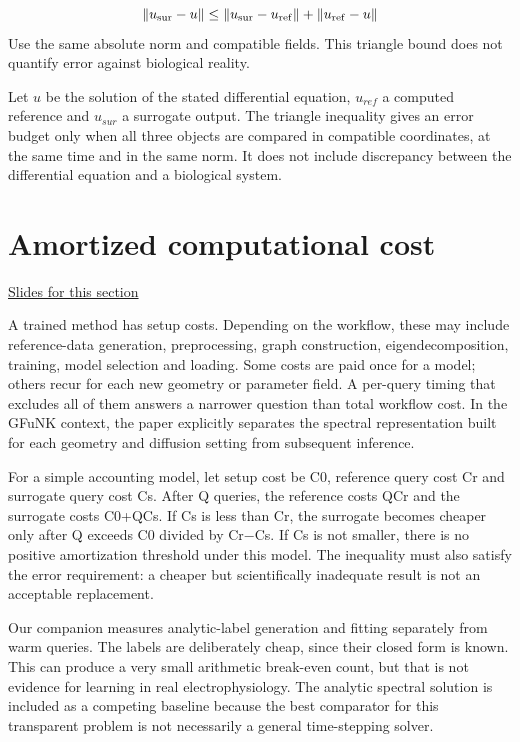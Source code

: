 \documentclass[11pt,letterpaper]{article}
\theoremstyle{definition}\newtheorem{definition}{Definition}\newtheorem{example}{Example}
\numberwithin{equation}{section}
\begin{document}
\[
\|u_{\rm sur}-u\|\le\|u_{\rm sur}-u_{\rm ref}\|+\|u_{\rm ref}-u\|
\]
Use the same absolute norm and compatible fields. This triangle bound does not quantify error against biological reality.

Let $u$ be the solution of the stated differential equation, $u_{ref}$ a computed reference and $u_{sur}$ a surrogate output. The triangle inequality gives an error budget only when all three objects are compared in compatible coordinates, at the same time and in the same norm. It does not include discrepancy between the differential equation and a biological system.
\section{Amortized computational cost}
\hypertarget{note-amortized-computational-cost}{}\label{note:amortized-computational-cost}
{\small \href{slides.html\#frame=total-reference-cost\&step=1}{Slides for this section}}\par
A trained method has setup costs. Depending on the workflow, these may include reference-data generation, preprocessing, graph construction, eigendecomposition, training, model selection and loading. Some costs are paid once for a model; others recur for each new geometry or parameter field. A per-query timing that excludes all of them answers a narrower question than total workflow cost. In the GFuNK context, the paper explicitly separates the spectral representation built for each geometry and diffusion setting from subsequent inference.

For a simple accounting model, let setup cost be C0, reference query cost Cr and surrogate query cost Cs. After Q queries, the reference costs QCr and the surrogate costs C0+QCs. If Cs is less than Cr, the surrogate becomes cheaper only after Q exceeds C0 divided by Cr\ensuremath{-}Cs. If Cs is not smaller, there is no positive amortization threshold under this model. The inequality must also satisfy the error requirement: a cheaper but scientifically inadequate result is not an acceptable replacement.

Our companion measures analytic-label generation and fitting separately from warm queries. The labels are deliberately cheap, since their closed form is known. This can produce a very small arithmetic break-even count, but that is not evidence for learning in real electrophysiology. The analytic spectral solution is included as a competing baseline because the best comparator for this transparent problem is not necessarily a general time-stepping solver.
\end{document}
